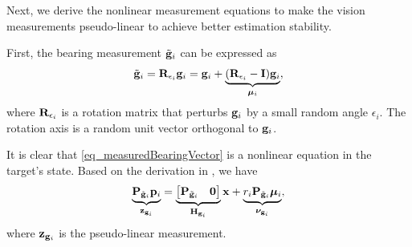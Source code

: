 \documentclass[letterpaper, 10 pt, conference]{ieeeconf}  %
\begin{document}
Next, we derive the nonlinear measurement equations to make the vision measurements pseudo-linear to achieve better estimation stability.

First, the bearing measurement $\tilde{\mathbf{g}}_i$ can be expressed as
\begin{align}
\tilde{\mathbf{g}}_i =\mathbf{R}_{\epsilon_i}\mathbf{g}_i = \mathbf{g}_i + \underbrace{(\mathbf{R}_{\epsilon_i} - \mathbf{I})\mathbf{g}_i}_{\boldsymbol{\mu}_i},
\label{eq_measuredBearingVector}
\end{align}
where $\mathbf{R}_{\epsilon_i}$ is a rotation matrix that perturbs $\mathbf{g}_i$ by a small random angle $\epsilon_i$. The rotation axis is a random unit vector orthogonal to $\mathbf{g}_i$.

It is clear that \eqref{eq_measuredBearingVector} is a nonlinear equation in the target's state.
Based on the derivation in \cite{zheng2023optimal}, we have
\begin{align}
\underbrace{\mathbf{P}_{\tilde{\mathbf{g}}_i}\mathbf{p}_i}_{\mathbf{z}_{\mathbf{g}_i}} = \underbrace{\begin{bmatrix}
\mathbf{P}_{\tilde{\mathbf{g}}_i} & \mathbf{0}
\end{bmatrix}}_{\mathbf{H}_{\mathbf{g}_i}}\mathbf{x} + \underbrace{r_i\mathbf{P}_{\tilde{\mathbf{g}}_i}\boldsymbol{\mu}_i}_{\boldsymbol{\nu}_{\mathbf{g}_i}},
\label{eq_g_pseudo}
\end{align}
where $\mathbf{z}_{\mathbf{g}_i}$ is the pseudo-linear measurement.
\end{document}

